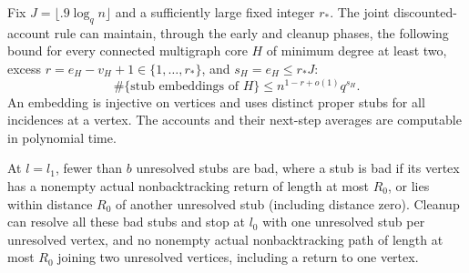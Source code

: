 \begin{lemma}
\label{lemma:structure}
Fix $J=\lfloor .9\log_qn\rfloor$ and a sufficiently large fixed integer
$r_*$. The joint discounted-account rule can maintain, through the
early and cleanup phases, the following bound for every connected
multigraph core $H$ of minimum degree at least two, excess
$r=e_H-v_H+1\in\{1,\ldots,r_*\}$, and $s_H=e_H\le r_*J$:
\begin{equation}
 \#\{\text{stub embeddings of }H\}
       \le n^{1-r+o(1)}q^{s_H}.
 \label{eq:original-3}
\end{equation}
An embedding is injective on vertices and uses distinct proper stubs
for all incidences at a vertex. The accounts and their next-step
averages are computable in polynomial time.

At $l=l_1$, fewer than $b$ unresolved stubs are bad, where a stub is bad
if its vertex has a nonempty actual nonbacktracking return of length at
most $R_0$, or lies within distance $R_0$ of another unresolved stub
(including distance zero). Cleanup can resolve all these bad stubs and
stop at $l_0$ with one unresolved stub per unresolved vertex, and no
nonempty actual nonbacktracking path of length at most $R_0$ joining
two unresolved vertices, including a return to one vertex.
\end{lemma}

